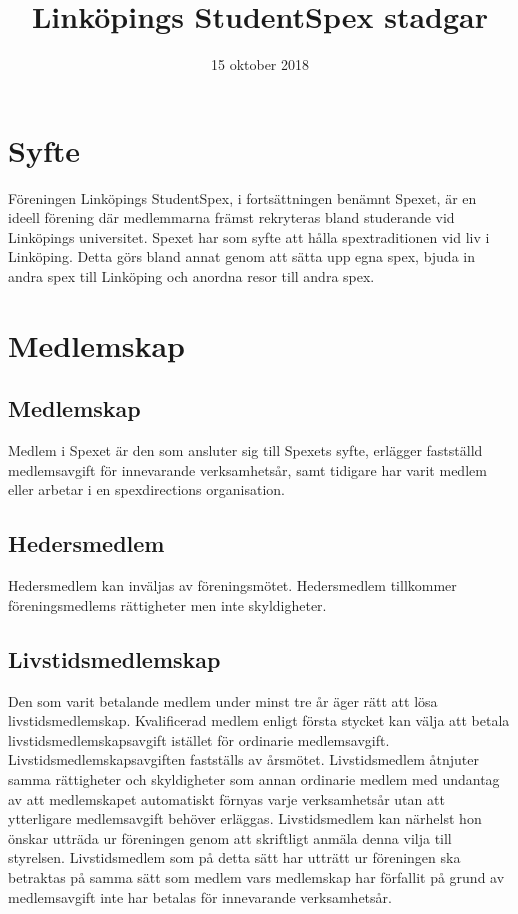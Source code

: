 \documentclass[a4paper]{article}
\title{Linköpings StudentSpex stadgar}
\author{}
\date{15 oktober 2018}
\begin{document}
\maketitle

\section{Syfte}
Föreningen Linköpings StudentSpex, i fortsättningen benämnt Spexet, är en ideell förening där medlemmarna främst rekryteras bland studerande vid Linköpings universitet. Spexet har som syfte att hålla spextraditionen vid liv i Linköping. Detta görs bland annat genom att sätta upp egna spex, bjuda in andra spex till Linköping och anordna resor till andra spex.

\section{Medlemskap}
\subsection{Medlemskap}
Medlem i Spexet är den som ansluter sig till Spexets syfte, erlägger fastställd medlemsavgift för innevarande verksamhetsår, samt tidigare har varit medlem eller arbetar i en spexdirections organisation.

\subsection{Hedersmedlem}
Hedersmedlem kan inväljas av föreningsmötet. Hedersmedlem tillkommer föreningsmedlems rättigheter men inte skyldigheter.

\subsection{Livstidsmedlemskap}
Den som varit betalande medlem under minst tre år äger rätt att lösa livstidsmedlemskap. Kvalificerad medlem enligt första stycket kan välja att betala livstidsmedlemskapsavgift istället för ordinarie medlemsavgift. \newline
\newline
Livstidsmedlemskapsavgiften fastställs av årsmötet.\newline
\newline
Livstidsmedlem åtnjuter samma rättigheter och skyldigheter som annan ordinarie medlem med undantag av att medlemskapet automatiskt förnyas varje verksamhetsår utan att ytterligare medlemsavgift behöver erläggas.\newline
\newline
Livstidsmedlem kan närhelst hon önskar utträda ur föreningen genom att skriftligt anmäla denna vilja till styrelsen. Livstidsmedlem som på detta sätt har utträtt ur föreningen ska betraktas på samma sätt som medlem vars medlemskap har förfallit på grund av medlemsavgift inte har betalas för innevarande verksamhetsår.
\end{document}
